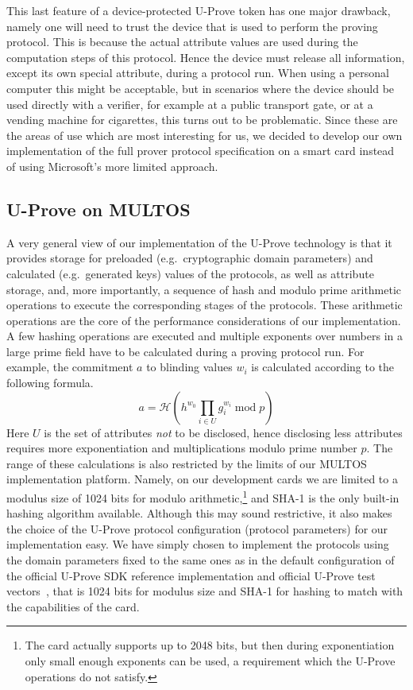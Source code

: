 This last feature of a device-protected U-Prove token has one major
drawback, namely one will need to trust the device that is used to perform
the proving protocol. This is because the actual attribute values are used
during the computation steps of this protocol. Hence the device must
release all information, except its own special attribute, during a
protocol run. When using a personal computer this might be acceptable, but
in scenarios where the device should be used directly with a verifier, for
example at a public transport gate, or at a vending machine for cigarettes,
this turns out to be problematic. Since these are the areas of use which
are most interesting for us, we decided to develop our own implementation
of the full prover protocol specification on a smart card instead of using
Microsoft's more limited approach.

\subsection{U-Prove on MULTOS}

A very general view of our implementation of the U-Prove technology is
that it provides storage for preloaded (e.g.\ cryptographic domain
parameters) and calculated (e.g.\ generated keys) values of the
protocols, as well as attribute storage, and, more importantly, a
sequence of hash and modulo prime arithmetic operations to execute the
corresponding stages of the protocols. These arithmetic operations are
the core of the performance considerations of our implementation. A few
hashing operations are executed and multiple exponents over numbers in
a large prime field have to be calculated during a proving
protocol run. For example, the commitment $a$ to blinding values $w_i$
is calculated according to the following formula.
\begin{equation}\label{eqn:a}
  a = \mathcal{H}(h^{w_0} \prod_{i \in U} g_i^{w_i} \mathop{\mathrm{mod}}
p)
\end{equation}
Here $U$ is the set of attributes \emph{not} to be disclosed, hence
disclosing less attributes requires more exponentiation and
multiplications modulo prime number $p$. The range of these calculations
is also restricted by the limits of our MULTOS implementation platform.
Namely, on our
development cards we are limited to a modulus size of 1024 bits for
modulo arithmetic,\footnote{The card actually supports up to 2048
  bits, but then during exponentiation only small enough exponents can
  be used, a requirement which the U-Prove operations do not satisfy.}
and SHA-1 is the only built-in hashing algorithm available. Although
this may sound restrictive, it also makes the choice of the U-Prove
protocol configuration (protocol parameters) for our implementation
easy. We have simply chosen to implement the protocols using the
domain parameters fixed to the same ones as in the default
configuration of the official U-Prove SDK reference implementation and
official U-Prove test vectors~\cite{U-Prove_Vectors2011}, that is 1024
bits for modulus size and SHA-1 for hashing to match with the
capabilities of the card.

